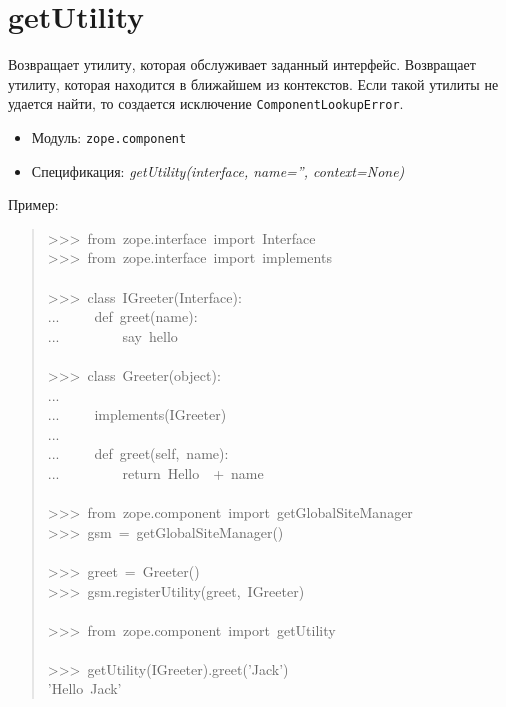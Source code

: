 \documentclass[a4paper,openany,twoside,final]{book}
\providecommand*{\DUroletitlereference}[1]{\textsl{#1}}
\begin{document}
\section*{getUtility%
  \label{getutility}%
}

Возвращает утилиту, которая обслуживает заданный интерфейс.
Возвращает утилиту, которая находится в ближайшем из контекстов.  Если
такой утилиты не удается найти, то создается исключение
\texttt{ComponentLookupError}.

\begin{itemize}

\item Модуль: \texttt{zope.component}

\item Спецификация: \DUroletitlereference{getUtility(interface, name='', context=None)}

\end{itemize}

Пример:

\begin{quote}{\ttfamily \raggedright \noindent
>{}>{}>~from~zope.interface~import~Interface\\
>{}>{}>~from~zope.interface~import~implements\\
~\\
>{}>{}>~class~IGreeter(Interface):\\
...~~~~~def~greet(name):\\
...~~~~~~~~~\textquotedbl{}say~hello\textquotedbl{}\\
~\\
>{}>{}>~class~Greeter(object):\\
...\\
...~~~~~implements(IGreeter)\\
...\\
...~~~~~def~greet(self,~name):\\
...~~~~~~~~~return~\textquotedbl{}Hello~\textquotedbl{}~+~name\\
~\\
>{}>{}>~from~zope.component~import~getGlobalSiteManager\\
>{}>{}>~gsm~=~getGlobalSiteManager()\\
~\\
>{}>{}>~greet~=~Greeter()\\
>{}>{}>~gsm.registerUtility(greet,~IGreeter)\\
~\\
>{}>{}>~from~zope.component~import~getUtility\\
~\\
>{}>{}>~getUtility(IGreeter).greet('Jack')\\
'Hello~Jack'
}
\end{quote}
\end{document}
